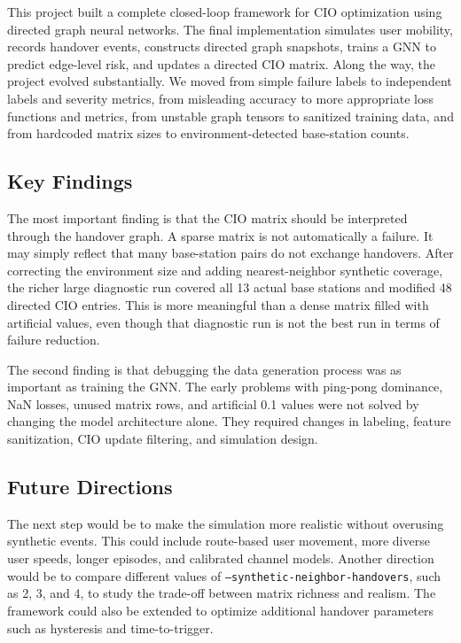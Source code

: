 \documentclass[11pt, a4paper, twoside]{article}
\begin{document}
This project built a complete closed-loop framework for CIO optimization using directed graph neural networks. The final implementation simulates user mobility, records handover events, constructs directed graph snapshots, trains a GNN to predict edge-level risk, and updates a directed CIO matrix. Along the way, the project evolved substantially. We moved from simple failure labels to independent labels and severity metrics, from misleading accuracy to more appropriate loss functions and metrics, from unstable graph tensors to sanitized training data, and from hardcoded matrix sizes to environment-detected base-station counts.

\subsection{Key Findings}

The most important finding is that the CIO matrix should be interpreted through the handover graph. A sparse matrix is not automatically a failure. It may simply reflect that many base-station pairs do not exchange handovers. After correcting the environment size and adding nearest-neighbor synthetic coverage, the richer large diagnostic run covered all 13 actual base stations and modified 48 directed CIO entries. This is more meaningful than a dense matrix filled with artificial values, even though that diagnostic run is not the best run in terms of failure reduction.

The second finding is that debugging the data generation process was as important as training the GNN. The early problems with ping-pong dominance, NaN losses, unused matrix rows, and artificial 0.1 values were not solved by changing the model architecture alone. They required changes in labeling, feature sanitization, CIO update filtering, and simulation design.

\subsection{Future Directions}

The next step would be to make the simulation more realistic without overusing synthetic events. This could include route-based user movement, more diverse user speeds, longer episodes, and calibrated channel models. Another direction would be to compare different values of \texttt{--synthetic-neighbor-handovers}, such as 2, 3, and 4, to study the trade-off between matrix richness and realism. The framework could also be extended to optimize additional handover parameters such as hysteresis and time-to-trigger.
\end{document}
